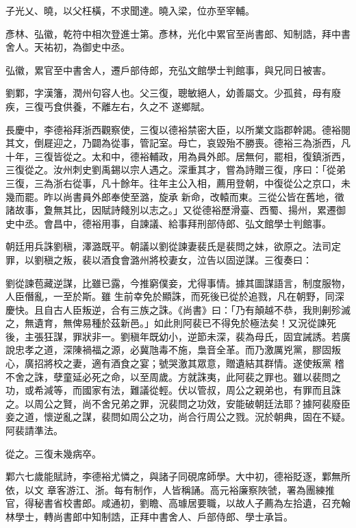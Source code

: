\begin{pinyinscope}
 子光乂、曉，以父枉橫，不求聞達。曉入梁，位亦至宰輔。



 彥林、弘徽，乾符中相次登進士第。彥林，光化中累官至尚書郎、知制誥，拜中書舍人。天祐初，為御史中丞。



 弘徽，累官至中書舍人，遷戶部侍郎，充弘文館學士判館事，與兄同日被害。



 劉鄴，字漢籓，潤州句容人也。父三復，聰敏絕人，幼善屬文。少孤貧，母有廢疾，三復丐食供養，不離左右，久之不
 遂鄉賦。



 長慶中，李德裕拜浙西觀察使，三復以德裕禁密大臣，以所業文詣郡幹謁。德裕閱其文，倒屣迎之，乃闢為從事，管記室。母亡，哀毀殆不勝喪。德裕三為浙西，凡十年，三復皆從之。太和中，德裕輔政，用為員外郎。居無何，罷相，復鎮浙西，三復從之。汝州刺史劉禹錫以宗人遇之。深重其才，嘗為詩贈三復，序曰：「從弟三復，三為浙右從事，凡十餘年。往年主公入相，薦用登朝，中復從公之京口，未幾而罷。昨以尚書員外郎奉使至潞，旋承
 新命，改轅而東。三從公皆在舊地，徵諸故事，夐無其比，因賦詩餞別以志之。」又從德裕歷滑臺、西蜀、揚州，累遷御史中丞。會昌中，德裕用事，自諫議、給事拜刑部侍郎、弘文館學士判館事。



 朝廷用兵誅劉稹，澤潞既平。朝議以劉從諫妻裴氏是裴問之妹，欲原之。法司定罪，以劉稹之叛，裴以酒食會潞州將校妻女，泣告以固逆謀。三復奏曰：



 劉從諫苞藏逆謀，比雖已露，今推窮僕妾，尤得事情。據其圖謀語言，制度服物，人臣僭亂，一至於斯。雖
 生前幸免於顯誅，而死後已從於追戮，凡在朝野，同深慶快。且自古人臣叛逆，合有三族之誅。《尚書》曰：「乃有顛越不恭，我則劓殄滅之，無遺育，無俾易種於茲新邑。」如此則阿裴已不得免於極法矣！又況從諫死後，主張狂謀，罪狀非一。劉稹年既幼小，逆節未深，裴為母氏，固宜誡誘。若廣說忠孝之道，深陳禍福之源，必冀虺毒不施，梟音全革。而乃激厲兇黨，膠固叛心，廣招將校之妻，適有酒食之宴；號哭激其眾意，贈遺結其群情。遂使叛黨
 稽不舍之誅，孽童延必死之命，以至周歲。方就誅夷，此阿裴之罪也。雖以裴問之功，或希減等，而國家有法，難議從輕。伏以管叔，周公之親弟也，有罪而且誅之。以周公之賢，尚不舍兄弟之罪，況裴問之功效，安能破朝廷法耶？據阿裴廢臣妾之道，懷逆亂之謀，裴問如周公之功，尚合行周公之戮。況於朝典，固在不疑。阿裴請準法。



 從之。三復未幾病卒。



 鄴六七歲能賦詩，李德裕尤憐之，與諸子同硯席師學。大中初，德裕貶逐，鄴無所依，以文
 章客游江、浙。每有制作，人皆稱誦。高元裕廉察陜虢，署為團練推官，得秘書省校書郎。咸通初，劉瞻、高璩居要職，以故人子薦為左拾遺，召充翰林學士，轉尚書郎中知制誥，正拜中書舍人、戶部侍郎、學士承旨。




\end{pinyinscope}
